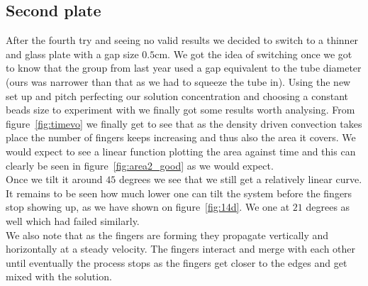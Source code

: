 \documentclass[twoside]{article}
\begin{document}
\begin{multicols}{2}
\subsection{Second plate}
After the fourth try and seeing no valid results we decided to switch to a thinner and glass plate with a gap size $0.5$cm. We got the idea of switching once we got to know that the group from last year used a gap equivalent to the tube diameter (ours was narrower than that as we had to squeeze the tube in). Using the new set up and pitch perfecting our solution concentration and choosing a constant beads size to experiment with we finally got some results worth analysing. From figure~\ref{fig:timevo} we finally get to see that as the density driven convection takes place the number of fingers keeps increasing and thus also the area it covers. We would expect to see a linear function plotting the area against time and this can clearly be seen in figure~\ref{fig:area2_good} as we would expect. \\
Once we tilt it around $45$ degrees we see that we still get a relatively linear curve. It remains to be seen how much lower one can tilt the system before the fingers stop showing up, as we have shown on figure~\ref{fig:14d}. We one at $21$ degrees as well which had failed similarly.\\ 
We also note that as the fingers are forming they propagate vertically and horizontally at a steady velocity. The fingers interact and merge with each other until eventually the process stops as the fingers get closer to the edges and get mixed with the solution.

\end{multicols}
\end{document}
